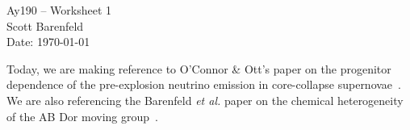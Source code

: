 \documentclass[11pt,letterpaper]{article}
\begin{document}
\begin{center}
\Large
Ay190 -- Worksheet 1\\
Scott Barenfeld\\
Date: \today
\end{center}

Today, we are making reference to O'Connor \& Ott's paper on the
progenitor dependence of the pre-explosion neutrino emission in
core-collapse supernovae~\cite{oconnor:13}.  We are also 
referencing the Barenfeld \emph{et al.} paper on the 
chemical heterogeneity of the AB Dor moving group~\cite{barenfeld:13}.




\end{document}
